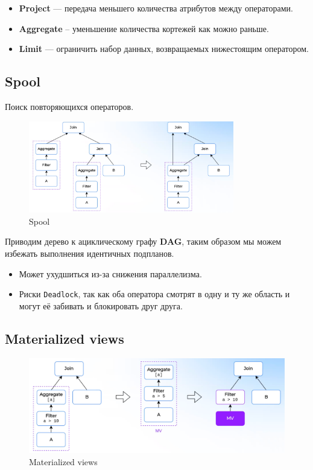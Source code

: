 \documentclass[11pt]{article}
\begin{document}
    \begin{itemize}
        \item \textbf{Project} --- передача меньшего количества атрибутов между операторами.
        \item \textbf{Aggregate} -- уменьшение количества кортежей как можно раньше.
        \item \textbf{Limit} --- ограничить набор данных, возвращаемых нижестоящим оператором.
    \end{itemize}

    \subsection{Spool}

    Поиск повторяющихся операторов.

    \begin{figure}[h!]
        \centering
        \includegraphics[width=0.8\textwidth]{Pictures/Ключевые оптимизации/Spool}
        \caption{Spool}
    \end{figure}

    Приводим дерево к ациклическому графу \textbf{DAG}, таким образом мы можем избежать выполнения идентичных подпланов.

    \begin{itemize}[label=-]
        \item Может ухудшиться из-за снижения параллелизма.
        \item Риски \texttt{Deadlock}, так как оба оператора смотрят в одну и ту же область и могут её забивать и блокировать друг друга.
    \end{itemize}

    \subsection{Materialized views}

    \begin{figure}[h!]
        \centering
        \includegraphics[width=\textwidth]{Pictures/Ключевые оптимизации/Materialized views}
        \caption{Materialized views}
    \end{figure}
\end{document}
